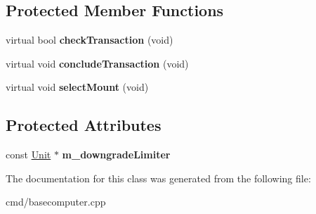 \subsection*{Protected Member Functions}
\begin{DoxyCompactItemize}
\item 
virtual bool {\bfseries check\+Transaction} (void)\hypertarget{classBaseComputer_1_1SellUpgradeOperation_a883700360588da03d3891df234ae2730}{}\label{classBaseComputer_1_1SellUpgradeOperation_a883700360588da03d3891df234ae2730}

\item 
virtual void {\bfseries conclude\+Transaction} (void)\hypertarget{classBaseComputer_1_1SellUpgradeOperation_aa470035e760be5245afbcc6e04438d0a}{}\label{classBaseComputer_1_1SellUpgradeOperation_aa470035e760be5245afbcc6e04438d0a}

\item 
virtual void {\bfseries select\+Mount} (void)\hypertarget{classBaseComputer_1_1SellUpgradeOperation_aac8f6289580f7ca57fcb433aa4528af9}{}\label{classBaseComputer_1_1SellUpgradeOperation_aac8f6289580f7ca57fcb433aa4528af9}

\end{DoxyCompactItemize}
\subsection*{Protected Attributes}
\begin{DoxyCompactItemize}
\item 
const \hyperlink{classUnit}{Unit} $\ast$ {\bfseries m\+\_\+downgrade\+Limiter}\hypertarget{classBaseComputer_1_1SellUpgradeOperation_a89a7d394f3481a6c824597823285d024}{}\label{classBaseComputer_1_1SellUpgradeOperation_a89a7d394f3481a6c824597823285d024}

\end{DoxyCompactItemize}


The documentation for this class was generated from the following file\+:\begin{DoxyCompactItemize}
\item 
cmd/basecomputer.\+cpp\end{DoxyCompactItemize}
